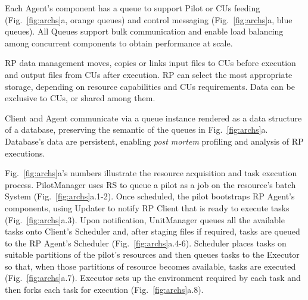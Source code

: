 \documentclass[preprint,12pt, a4paper]{elsarticle}
\begin{document}
Each Agent's component has a queue to support Pilot or CUs feeding
(Fig.~\ref{fig:archs}a, orange queues) and control messaging
(Fig.~\ref{fig:archs}a, blue queues). All Queues support bulk communication
and enable load balancing among concurrent components to obtain performance
at scale.


RP data management moves, copies or links input files to CUs before execution
and output files from CUs after execution. RP can select the most appropriate
storage, depending on resource capabilities and CUs requirements. Data can
be exclusive to CUs, or shared among them.


Client and Agent communicate via a queue instance rendered as a data
structure of a database, preserving the semantic of the queues in
Fig.~\ref{fig:archs}a. Database's data are persistent, enabling \textit{post
mortem} profiling and analysis of RP executions.

Fig.~\ref{fig:archs}a's numbers illustrate the resource acquisition and
task execution process. PilotManager uses RS to queue a pilot as a job on
the resource's batch System (Fig.~\ref{fig:archs}a.1-2). Once scheduled,
the pilot bootstraps RP Agent's components, using Updater to notify RP
Client that is ready to execute tasks (Fig.~\ref{fig:archs}a.3). Upon
notification, UnitManager queues all the available tasks onto Client's
Scheduler and, after staging files if required, tasks are queued to the RP
Agent's Scheduler (Fig.~\ref{fig:archs}a.4-6). Scheduler places tasks on
suitable partitions of the pilot's resources and then queues tasks to the
Executor so that, when those partitions of resource becomes available,
tasks are executed (Fig.~\ref{fig:archs}a.7). Executor sets up the
environment required by each task and then forks each task for execution
(Fig.~\ref{fig:archs}a.8).
\end{document}
